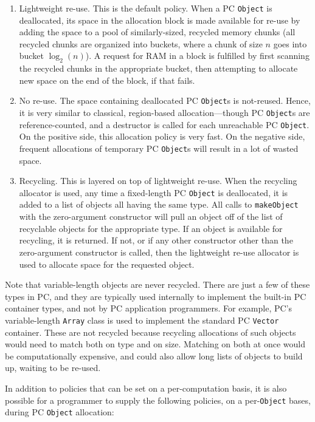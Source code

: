 \begin{enumerate}

\item Lightweight re-use.  This is the default policy.  When a PC \texttt{Object} is deallocated, its space in the allocation block is made available for re-use by
adding the space to a pool of similarly-sized, recycled memory chunks (all recycled chunks are organized into buckets, where a chunk of size
$n$ goes into bucket $\log_2 (n)$).  A request for RAM in a block is fulfilled by first scanning the recycled chunks in the appropriate bucket, then
attempting to allocate new space on the end of the block, if that fails.
\item No re-use.  The space containing deallocated PC \texttt{Object}s is not-reused.  Hence, it is very similar to classical, region-based allocation---though PC \texttt{Object}s
are reference-counted, and a destructor is called for each unreachable PC \texttt{Object}.
On the positive side, this allocation policy is very fast.  On the negative side, frequent allocations of temporary PC \texttt{Object}s will result in a lot of wasted space.
\item Recycling.  This is layered on top of lightweight re-use.  When the recycling allocator is used, any time a fixed-length
PC \texttt{Object} is deallocated, it is
added to a list of objects all having the same type.  All calls to \texttt{makeObject} with the zero-argument constructor will
pull an object off of the list of recyclable objects for the appropriate type.  
If an object is available for recycling, it is returned.  If not, or if any other constructor other than the zero-argument constructor is called, 
then the lightweight re-use allocator is used to allocate space for the requested
object.

\end{enumerate}

Note that
variable-length objects are never recycled.  There are just a few of these types in PC, and they are typically
used internally to implement the built-in PC container
types, and not by PC application programmers.  For example, PC's variable-length
\texttt{Array} class is used to implement the standard PC \texttt{Vector} container.  
These are not recycled because recycling allocations of such objects would need to match both on type and on size.  Matching on both at once would 
be computationally expensive, and could also allow long lists of objects to build up, waiting to be re-used.

In addition to policies that can be set on a per-computation basis,
it is also possible for a programmer to supply the following policies, on a per-\texttt{Object} bases, during PC \texttt{Object} allocation:

